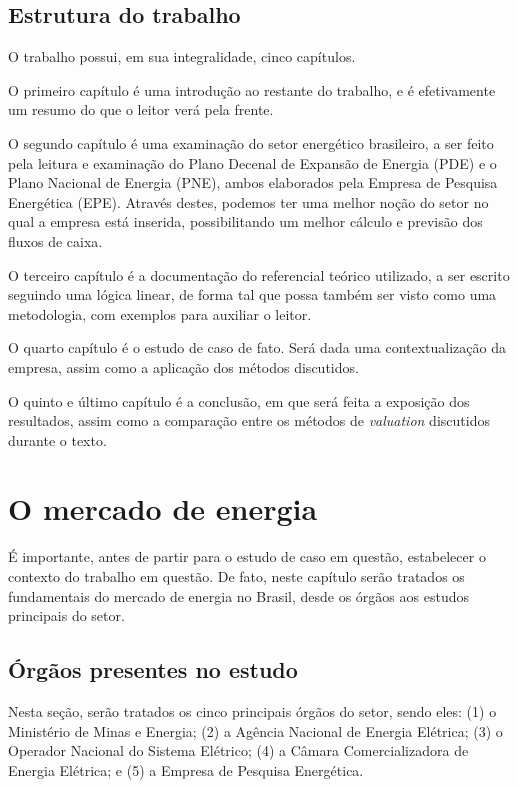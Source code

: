 \documentclass[grad,numbers]{coppe}
\begin{document}
  \hypertarget{estrutura-do-trabalho}{%
  \section{Estrutura do trabalho}\label{estrutura-do-trabalho}}

  O trabalho possui, em sua integralidade, cinco capítulos.

  O primeiro capítulo é uma introdução ao restante do trabalho, e é efetivamente um resumo do que o leitor verá pela frente.

  O segundo capítulo é uma examinação do setor energético brasileiro, a ser feito pela leitura e examinação do Plano Decenal de Expansão de Energia (PDE) e o Plano Nacional de Energia (PNE), ambos elaborados pela Empresa de Pesquisa Energética (EPE). Através destes, podemos ter uma melhor noção do setor no qual a empresa está inserida, possibilitando um melhor cálculo e previsão dos fluxos de caixa.

  O terceiro capítulo é a documentação do referencial teórico utilizado, a ser escrito seguindo uma lógica linear, de forma tal que possa também ser visto como uma metodologia, com exemplos para auxiliar o leitor.

  O quarto capítulo é o estudo de caso de fato. Será dada uma contextualização da empresa, assim como a aplicação dos métodos discutidos.

  O quinto e último capítulo é a conclusão, em que será feita a exposição dos resultados, assim como a comparação entre os métodos de \emph{valuation} discutidos durante o texto.

  \hypertarget{o-mercado-de-energia}{%
  \chapter{O mercado de energia}\label{o-mercado-de-energia}}

  É importante, antes de partir para o estudo de caso em questão, estabelecer o contexto do trabalho em questão. De fato, neste capítulo serão tratados os fundamentais do mercado de energia no Brasil, desde os órgãos aos estudos principais do setor.

  \hypertarget{uxf3rguxe3os-presentes-no-estudo}{%
  \section{Órgãos presentes no estudo}\label{uxf3rguxe3os-presentes-no-estudo}}

  Nesta seção, serão tratados os cinco principais órgãos do setor, sendo eles: (1) o Ministério de Minas e Energia; (2) a Agência Nacional de Energia Elétrica; (3) o Operador Nacional do Sistema Elétrico; (4) a Câmara Comercializadora de Energia Elétrica; e (5) a Empresa de Pesquisa Energética.
\end{document}

